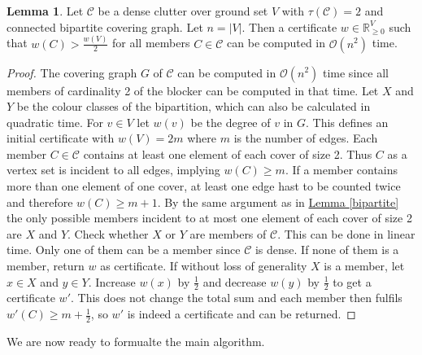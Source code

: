 \documentclass[a4paper, 12pt, twoside=false]{scrbook}
\theoremstyle{definition}
\newtheorem{lemma}[theorem]{Lemma}
\newcommand*{\IR}{\ensuremath{\mathbb{R}}}
\begin{document}
   \begin{lemma}\label{computecert}
       Let $\mathcal{C}$ be a dense clutter over ground set $V$ with $\tau(\mathcal{C})=2$ and connected bipartite covering graph. Let $n=|V|$. Then a certificate $w \in \IR^V_{\geq 0}$ such that $w(C)>\frac{w(V)}{2}$ for all members $C \in \mathcal{C}$ can be computed in $\mathcal{O}(n^2)$ time.
   \end{lemma}

   \begin{proof}
       The covering graph $G$ of $\mathcal{C}$ can be computed in $\mathcal{O}(n^2)$ time since all members of cardinality 2 of the blocker can be computed in that time.
       Let $X$ and $Y$ be the colour classes of the bipartition, which can also be calculated in quadratic time.
       For $v \in V$ let $w(v)$ be the degree of $v$ in $G$. This defines an initial certificate with $w(V) = 2m$ where $m$ is the number of edges.
       Each member $C \in \mathcal{C}$ contains at least one element of each cover of size 2. Thus $C$ as a vertex set is incident to all edges, implying $w(C) \geq m$.
       If a member contains more than one element of one cover, at least one edge hast to be counted twice and therefore $w(C) \geq m+1$.
       By the same argument as in \hyperref[bipartite]{Lemma \ref*{bipartite}} the only possible members incident to at most one element of each cover of size 2 are $X$ and $Y$.
       Check whether $X$ or $Y$ are members of $\mathcal{C}$. This can be done in linear time.
       Only one of them can be a member since $\mathcal{C}$ is dense.
       If none of them is a member, return $w$ as certificate.
       If without loss of generality $X$ is a member, let $x \in X$ and $y \in Y$.
       Increase $w(x)$ by $\frac 12$ and decrease $w(y)$ by $\frac 12$ to get a certificate $w'$.
       This does not change the total sum and each member then fulfils $w'(C) \geq m + \frac 12$, so $w'$ is indeed a certificate and can be returned.
   \end{proof}
   We are now ready to formualte the main algorithm.
   \newline
\end{document}
